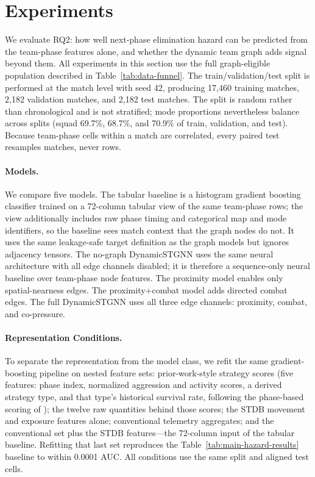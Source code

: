 \section{Experiments}
\label{sec:experiments}

We evaluate RQ2: how well next-phase elimination hazard can be predicted from
the team-phase features alone, and whether the dynamic team graph adds signal
beyond them. All experiments in this section use the full graph-eligible
population described in Table~\ref{tab:data-funnel}. The train/validation/test
split is performed at the match level with seed 42, producing 17,460 training
matches, 2,182 validation matches, and 2,182 test matches. The split is
random rather than chronological and is not stratified; mode proportions
nevertheless balance across splits (squad 69.7\%, 68.7\%, and 70.9\% of
train, validation, and test). Because team-phase cells within a match are
correlated, every paired test resamples matches, never rows.

\paragraph{Models.}
We compare five models. The tabular baseline is a histogram gradient
boosting classifier trained on a 72-column tabular view of the same team-phase
rows; the view additionally includes raw phase timing and categorical map and
mode identifiers, so the baseline sees match context that the graph nodes do
not. It uses the same leakage-safe target definition as the graph models but
ignores adjacency tensors. The no-graph DynamicSTGNN uses the same neural architecture
with all edge channels disabled; it is therefore a sequence-only neural
baseline over team-phase node features. The proximity model enables only
spatial-nearness edges. The proximity+combat model adds directed combat edges.
The full DynamicSTGNN uses all three edge channels: proximity, combat, and
co-pressure.

\paragraph{Representation Conditions.}
To separate the representation from the model class, we refit the same
gradient-boosting pipeline on nested feature sets: prior-work-style strategy
scores (five features: phase index, normalized aggression and activity scores,
a derived strategy type, and that type's historical survival rate, following
the phase-based scoring of \cite{sagong2025hunterCamper}); the twelve raw
quantities behind those scores; the STDB movement and exposure features alone;
conventional telemetry aggregates; and the conventional set plus the STDB
features---the 72-column input of the tabular baseline. Refitting that last
set reproduces the Table~\ref{tab:main-hazard-results} baseline to within
0.0001 AUC. All conditions use the same split and aligned test cells.

